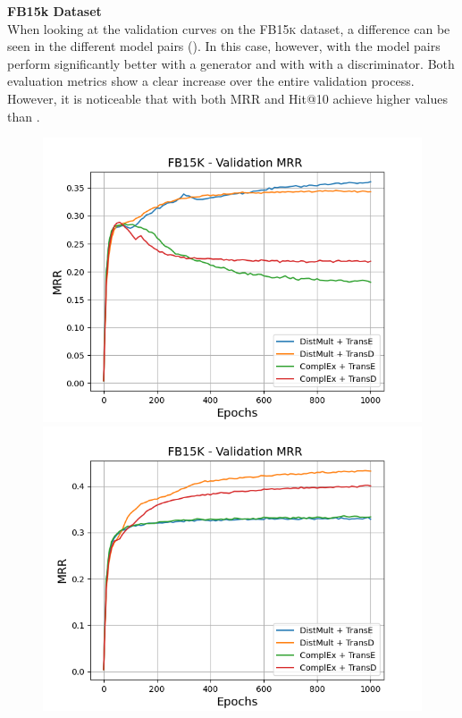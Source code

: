 \textbf{FB15k Dataset}
\label{subsubsec:methods_fb15k}\\
%
When looking at the validation curves on the \textsc{FB15k} dataset, a difference can be seen in the different model pairs ().
In this case, however, with \usmax the model pairs perform significantly better with a \distmult generator and with \ussoftmax with a \transd discriminator.
Both evaluation metrics show a clear increase over the entire validation process.
However, it is noticeable that with \ussoftmax both MRR and Hit@10 achieve higher values than \usmax.
\begin{figure}[H]
    \centering
    \begin{minipage}{.5\textwidth}
      \centering
      \includegraphics[width=0.9\linewidth]{figures/results/gan_train/not_pretrained/uncertainty/max/entropy/fb15k/1k_epochs/uncertainty_fb15k_mrrs.png}
    \end{minipage}%
    \begin{minipage}{.5\textwidth}
      \centering
      \includegraphics[width=0.9\linewidth]{figures/results/gan_train/not_pretrained/uncertainty/max_distribution/entropy/fb15k/1k_epochs/uncertainty_fb15k_mrrs.png}

\end{minipage}
\end{figure}

